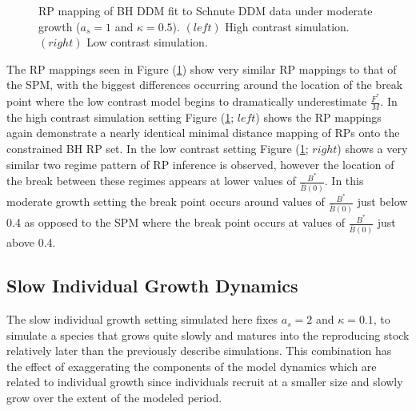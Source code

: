 \begin{figure}[h!]
\begin{minipage}[h!]{0.09\textwidth}
\end{minipage}
\caption{
RP mapping of BH DDM fit to Schnute DDM data under moderate growth ($a_s=1$ and $\kappa=0.5$).
$(left)$ High contrast simulation.
$(right)$ Low contrast simulation.
}\label{moderateGrowth}
\end{figure}

%
The RP mappings seen in Figure (\ref{moderateGrowth}) show very similar RP mappings
to that of the SPM, with the biggest differences occurring
around the location of the break point where the low contrast model begins to
dramatically underestimate $\frac{F^*}{M}$.
%
In the high contrast simulation setting Figure (\ref{moderateGrowth}; $left$) shows
the RP mappings again demonstrate a nearly identical minimal distance mapping of
RPs onto the constrained BH RP set. In the low contrast setting Figure (\ref{moderateGrowth}; $right$) 
shows a very similar two regime pattern of RP inference is observed, however the
location of the break between these regimes appears at lower values of
$\frac{B^*}{\bar B(0)}$. In this moderate growth setting the break point
occurs around values of $\frac{B^*}{\bar B(0)}$ just below 0.4 as opposed to 
the SPM where the break point occurs at values of $\frac{B^*}{\bar B(0)}$ just above 0.4.


\subsection{Slow Individual Growth Dynamics\label{slow}}

%
The slow individual growth setting simulated here fixes $a_s=2$ and $\kappa=0.1$, to
simulate a species that grows quite slowly and matures into the reproducing  
stock relatively later than the previously describe simulations. This combination has 
the effect of exaggerating the components of the model dynamics which are related to
individual growth since individuals recruit at a smaller size and slowly
grow over the extent of the modeled period.

